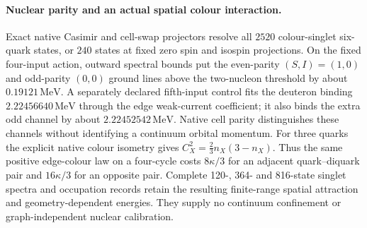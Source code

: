 \paragraph{Nuclear parity and an actual spatial colour interaction.}
Exact native Casimir and cell-swap projectors resolve all $2520$
colour-singlet six-quark states, or $240$ states at fixed zero spin and
isospin projections. On the fixed four-input action, outward spectral
bounds put the even-parity $(S,I)=(1,0)$ and odd-parity $(0,0)$ ground lines
above the two-nucleon threshold by about $0.19121\,\mathrm{MeV}$.
A separately declared fifth-input control fits the deuteron binding
$2.22456640\,\mathrm{MeV}$ through the edge weak-current coefficient;
it also binds the extra odd channel by about $2.22452542\,\mathrm{MeV}$.
Native cell parity distinguishes these channels without identifying a
continuum orbital momentum.
For three quarks the explicit native colour isometry gives
$C_X^2=\frac23n_X(3-n_X)$. Thus the same positive edge-colour law on a
four-cycle costs $8\kappa/3$ for an adjacent quark--diquark pair and
$16\kappa/3$ for an opposite pair. Complete 120-, 364- and 816-state
singlet spectra and occupation records retain the resulting finite-range
spatial attraction and geometry-dependent energies. They supply no
continuum confinement or graph-independent nuclear calibration.
